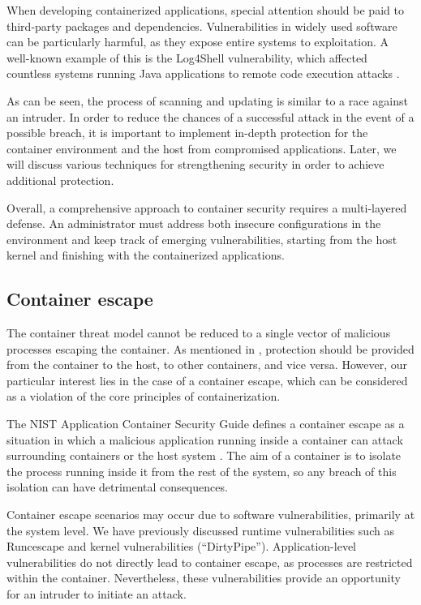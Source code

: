When developing containerized applications, special attention should be paid to third-party packages and dependencies. Vulnerabilities in widely used software can be particularly harmful, as they expose entire systems to exploitation. A well-known example of this is the Log4Shell vulnerability, which affected countless systems running Java applications to remote code execution attacks \cite{nvd:CVE-2021-44228}.

As can be seen, the process of scanning and updating is similar to a race against an intruder. In order to reduce the chances of a successful attack in the event of a possible breach, it is important to implement in-depth protection for the container environment and the host from compromised applications. Later, we will discuss various techniques for strengthening security in order to achieve additional protection.

Overall, a comprehensive approach to container security requires a multi-layered defense. An administrator must address both insecure configurations in the environment and keep track of emerging vulnerabilities, starting from the host kernel and finishing with the containerized applications.


\clearpage
\subsection{Container escape}

The container threat model cannot be reduced to a single vector of malicious processes escaping the container. As mentioned in \cite{ieee:1}, protection should be provided from the container to the host, to other containers, and vice versa. However, our particular interest lies in the case of a container escape, which can be considered as a violation of the core principles of containerization.

The NIST Application Container Security Guide defines a container escape as a situation in which a malicious application running inside a container can attack surrounding containers or the host system \cite{nist:docker}. The aim of a container is to isolate the process running inside it from the rest of the system, so any breach of this isolation can have detrimental consequences.

Container escape scenarios may occur due to software vulnerabilities, primarily at the system level. We have previously discussed runtime vulnerabilities such as Runcescape and kernel vulnerabilities (``DirtyPipe''). Application-level vulnerabilities do not directly lead to container escape, as processes are restricted within the container. Nevertheless, these vulnerabilities provide an opportunity for an intruder to initiate an attack.

